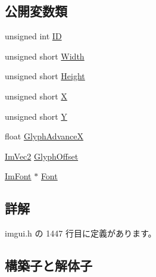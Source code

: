 \subsection*{公開変数類}
\begin{DoxyCompactItemize}
\item 
unsigned int \mbox{\hyperlink{struct_im_font_atlas_1_1_custom_rect_a1afc9c6d72105e6695fbefa08e086387}{ID}}
\item 
unsigned short \mbox{\hyperlink{struct_im_font_atlas_1_1_custom_rect_a961e02b6cda1eb69dfd2f2d40ae40d5f}{Width}}
\item 
unsigned short \mbox{\hyperlink{struct_im_font_atlas_1_1_custom_rect_a7b423a44d98a6f5695941300906418e5}{Height}}
\item 
unsigned short \mbox{\hyperlink{struct_im_font_atlas_1_1_custom_rect_af080bc8663332dfd5576d9a6a5313089}{X}}
\item 
unsigned short \mbox{\hyperlink{struct_im_font_atlas_1_1_custom_rect_ae1739c480b82fa11ebdd1edb9e3cf5eb}{Y}}
\item 
float \mbox{\hyperlink{struct_im_font_atlas_1_1_custom_rect_afb55b310d9816386f2eb2f11df9f11e2}{Glyph\+AdvanceX}}
\item 
\mbox{\hyperlink{struct_im_vec2}{Im\+Vec2}} \mbox{\hyperlink{struct_im_font_atlas_1_1_custom_rect_a18a84c649c382fafe75eba628b5d599e}{Glyph\+Offset}}
\item 
\mbox{\hyperlink{struct_im_font}{Im\+Font}} $\ast$ \mbox{\hyperlink{struct_im_font_atlas_1_1_custom_rect_aeffa65b37c8d9241e3720472a019aad2}{Font}}
\end{DoxyCompactItemize}


\subsection{詳解}


 imgui.\+h の 1447 行目に定義があります。



\subsection{構築子と解体子}
\mbox{\label{struct_im_font_atlas_1_1_custom_rect_abee2845214da5ffc9c77bb388402a0a9}} 
